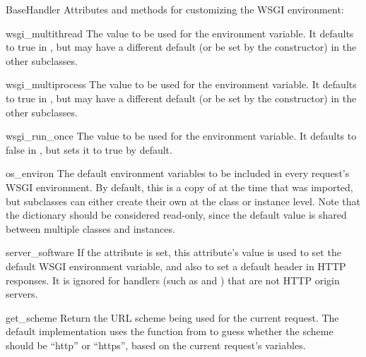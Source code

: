 \begin{classdesc}{BaseHandler}{}
Attributes and methods for customizing the WSGI environment:

\begin{memberdesc}{wsgi_multithread}
The value to be used for the  environment
variable.  It defaults to true in , but may have
a different default (or be set by the constructor) in the other
subclasses.
\end{memberdesc}

\begin{memberdesc}{wsgi_multiprocess}
The value to be used for the  environment
variable.  It defaults to true in , but may have
a different default (or be set by the constructor) in the other
subclasses.
\end{memberdesc}

\begin{memberdesc}{wsgi_run_once}
The value to be used for the  environment
variable.  It defaults to false in , but
 sets it to true by default.
\end{memberdesc}

\begin{memberdesc}{os_environ}
The default environment variables to be included in every request's
WSGI environment.  By default, this is a copy of  at
the time that  was imported, but subclasses can
either create their own at the class or instance level.  Note that the
dictionary should be considered read-only, since the default value is
shared between multiple classes and instances.
\end{memberdesc}

\begin{memberdesc}{server_software}
If the  attribute is set, this attribute's value
is used to set the default  WSGI environment
variable, and also to set a default  header in HTTP
responses.  It is ignored for handlers (such as 
and ) that are not HTTP origin servers.
\end{memberdesc}



\begin{methoddesc}{get_scheme}{}
Return the URL scheme being used for the current request.  The default
implementation uses the  function from
 to guess whether the scheme should be ``http'' or
``https'', based on the current request's  variables.
\end{methoddesc}


\end{classdesc}
